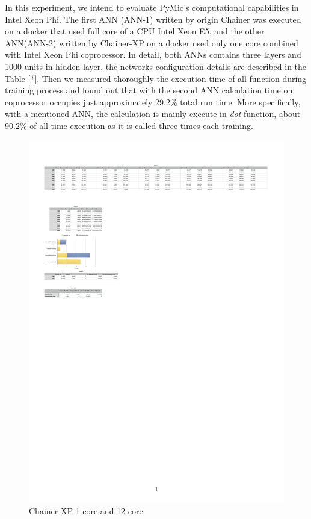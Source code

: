 In this experiment, we intend to evaluate PyMic's computational capabilities in Intel Xeon Phi. The first ANN (ANN-1) written by origin Chainer was executed on a docker that used full core of a CPU Intel Xeon E5, and the other ANN(ANN-2) written by Chainer-XP on a docker used only one core combined with Intel Xeon Phi coprocessor. In detail, both ANNs contains three layers and 1000 units in hidden layer, the networks configuration details are described in the Table [*]. Then we measured thoroughly the execution time of all function during training process and found out that with the second ANN calculation time on coprocessor occupies just approximately 29.2\% total run time. More specifically, with a mentioned ANN, the calculation is mainly execute in \textit{dot} function, about 90.2\% of all time execution as it is called three times each training.
\begin{figure}[]
\centering
\includegraphics[scale=0.5]{img/b.pdf}
\caption{Chainer-XP 1 core and 12 core}
\end{figure}

